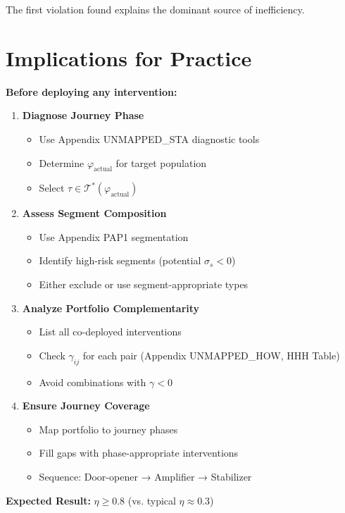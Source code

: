 The first violation found explains the dominant source of inefficiency.


\section{Implications for Practice}
\label{sec:eih-practice}

\begin{tcolorbox}[colback=blue!5!white, colframe=blue!75!black,
    title=The EIH Design Protocol]

\textbf{Before deploying any intervention:}

\begin{enumerate}
\item \textbf{Diagnose Journey Phase}
\begin{itemize}[nosep]
\item Use Appendix UNMAPPED_STA diagnostic tools
\item Determine $\varphi_{\text{actual}}$ for target population
\item Select $\tau \in \mathcal{T}^*(\varphi_{\text{actual}})$
\end{itemize}

\item \textbf{Assess Segment Composition}
\begin{itemize}[nosep]
\item Use Appendix PAP1 segmentation
\item Identify high-risk segments (potential $\sigma_s < 0$)
\item Either exclude or use segment-appropriate types
\end{itemize}

\item \textbf{Analyze Portfolio Complementarity}
\begin{itemize}[nosep]
\item List all co-deployed interventions
\item Check $\gamma_{ij}$ for each pair (Appendix UNMAPPED_HOW, HHH Table)
\item Avoid combinations with $\gamma < 0$
\end{itemize}

\item \textbf{Ensure Journey Coverage}
\begin{itemize}[nosep]
\item Map portfolio to journey phases
\item Fill gaps with phase-appropriate interventions
\item Sequence: Door-opener → Amplifier → Stabilizer
\end{itemize}
\end{enumerate}

\textbf{Expected Result:} $\eta \geq 0.8$ (vs. typical $\eta \approx 0.3$)
\end{tcolorbox}


